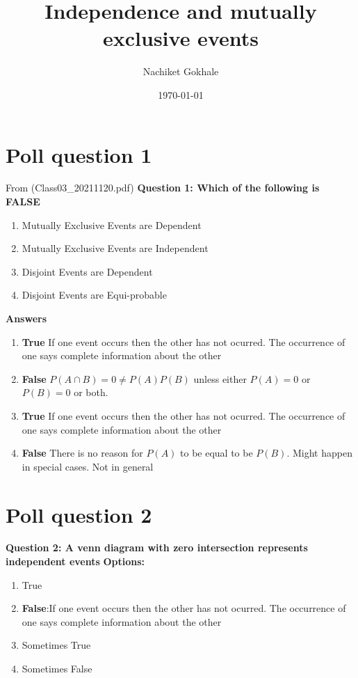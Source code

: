 \documentclass{article}
\begin{document}
\title{Independence and mutually exclusive events}
\author{Nachiket Gokhale}
\date{\today}
\maketitle
%
%
\section{Poll question 1}
%
From (Class03\_20211120.pdf)
%
\textbf{Question 1: Which of the following is FALSE}
\begin{enumerate}
\item{Mutually Exclusive Events are Dependent}
\item{Mutually Exclusive Events are Independent}
\item{Disjoint Events are Dependent}
\item{Disjoint Events are Equi-probable}  
\end{enumerate}
%
%
\textbf{Answers}
%
%
\begin{enumerate}
\item{\textbf{True} If one event occurs then the other has not ocurred. The occurrence of one says complete information about the other}  
\item{\textbf{False} $P(A\cap{B})=0\neq P(A)P(B)$ unless either $P(A)=0$ or $P(B)=0$ or both.}
\item{\textbf{True} If one event occurs then the other has not ocurred. The occurrence of one says complete information about the other}
\item{\textbf{False} There is no reason for $P(A)$ to be equal to be $P(B)$. Might happen in special cases. Not in general}  
\end{enumerate}
%
%
\section{Poll question 2}
\textbf{Question 2: A venn diagram with zero intersection represents independent events}
\textbf{Options:}
\begin{enumerate}
\item{True}
\item{\textbf{False}:If one event occurs then the other has not ocurred. The occurrence of one says complete information about the other}
\item{Sometimes True}
\item{Sometimes False}
\end{enumerate}  
%
%
\end{document}
